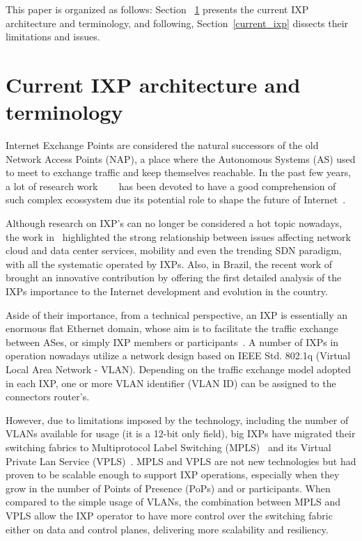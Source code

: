 \documentclass[conference]{IEEEtran/IEEEtran}
\begin{document}
This paper is organized as follows: Section ~\ref{ixp_intro} presents the current IXP architecture and terminology, and following, Section~\ref{current_ixp} dissects their limitations and issues.

\section{Current IXP architecture and terminology}
\label{ixp_intro}

Internet Exchange Points are considered the natural successors of the old Network Access Points (NAP), a place where the Autonomous Systems (AS) used to meet to exchange traffic and keep themselves reachable. In the past few years, a lot of research work ~\cite{ager2012anatomy}~\cite{haddadi2013}~\cite{chatzis2013benefits} has been devoted to have a good comprehension of such complex ecossystem due its potential role to shape the future of Internet~\cite{kloti2016comparative}.

Although research on IXP's can no longer be considered a hot topic nowadays, the work in~\cite{chatzis2013importance} highlighted the strong relationship between issues affecting network cloud and data center services, mobility and even the trending SDN paradigm, with all the systematic operated by IXPs. Also, in Brazil, the recent work of~\cite{brito2015anatomia} brought an innovative contribution by offering the first detailed analysis of the IXPs importance to the Internet development and evolution in the country. 

Aside of their importance, from a technical perspective, an IXP is essentially an enormous flat Ethernet domain, whose aim is to facilitate the traffic exchange between ASes, or simply IXP members or participants~\cite{euroix2012}. A number of IXPs in operation nowadays utilize a network design based on IEEE Std. 802.1q (Virtual Local Area Network - VLAN). Depending on the traffic exchange model adopted in each IXP, one or more VLAN identifier (VLAN ID) can be assigned to the connectors router's.

However, due to limitations imposed by the technology, including the number of VLANs available for usage (it is a 12-bit only field), big IXPs have migrated their switching fabrics to Multiprotocol Label Switching (MPLS)~\cite{rfc3031} and its Virtual Private Lan Service (VPLS)~\cite{rfc4761,rfc4762}. MPLS and VPLS are not new technologies but had proven to be scalable enough to support IXP operations, especially when they grow in the number of Points of Presence (PoPs) and or participants. When compared to the simple usage of VLANs, the combination between MPLS and VPLS allow the IXP operator to have more control over the switching fabric either on data and control planes, delivering more scalability and resiliency. 
\end{document}
